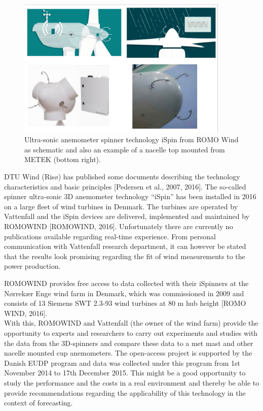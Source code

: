 \begin{figure}[h!]
\includegraphics[width=0.9\textwidth]{figures/nacelle_ispinner.png}
\caption{Ultra-sonic anemometer spinner technology iSpin from ROMO Wind as schematic and also an example of a nacelle top mounted from METEK (bottom right).}
\label{fig:ispinner}
\end{figure}

DTU Wind (Risø) has published some documents describing the technology characteristics and basic principles [Pedersen et al., 2007, 2016]. The so-called spinner ultra-sonic 3D anemometer technology “iSpin” has been installed in 2016 on a large fleet of wind turbines in Denmark. The turbines are operated by Vattenfall and the iSpin devices are delivered, implemented and maintained by ROMOWIND [ROMOWIND, 2016]. Unfortunately there are currently no publications available regarding real-time experience. From personal communication with Vattenfall research department, it can however be stated that the results look promising regarding the fit of wind measurements to the power production. 

ROMOWIND provides free access to data collected with their iSpinners at the Nørrekær Enge wind farm in Denmark, which was commissioned in 2009 and consists of 13 Siemens SWT 2.3-93 wind turbines at 80 m hub height [ROMO WIND, 2016].\\ With this, ROMOWIND and Vattenfall (the owner of the wind farm) provide the opportunity to experts and researchers to carry out experiments and studies with the data from the 3D-spinners and compare these data to a met mast and other nacelle mounted cup anemometers.
The open-access project is supported by the Danish EUDP program and data was collected under this program from 1st November 2014 to 17th December 2015. 
This might be a good opportunity to study the performance and the costs in a real environment and thereby be able to provide recommendations regarding the applicability of this technology in the context of forecasting.



